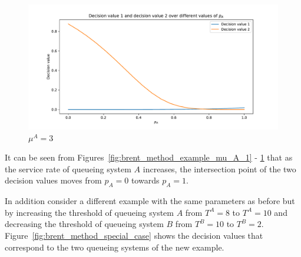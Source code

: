 \begin{figure}[H]
    \centering
    \includegraphics[width=\textwidth]{chapters/04_game_theoretic_model/img/brents_method/brent_method_example_mu_A_3.0.pdf}
    \caption{\(\mu^A = 3\)}
    \label{fig:brent_method_example_mu_A_5}
\end{figure}

It can be seen from Figures~\ref{fig:brent_method_example_mu_A_1} -
\ref{fig:brent_method_example_mu_A_5} that as the service rate of queueing
system \(A\) increases, the intersection point of the two decision values moves
from \(p_A=0\) towards \(p_A=1\).

In addition consider a different example with the same parameters as before
but by increasing the threshold of queueing system \(A\) from \(T^A = 8\) to
\(T^A = 10\) and decreasing the threshold of queueing system \(B\) from
\(T^B = 10\) to \(T^B = 2\).
Figure~\ref{fig:brent_method_special_case} shows the decision values that
correspond to the two queueing systems of the new example.

